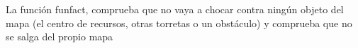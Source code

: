 La función funfact, comprueba que no vaya a chocar contra ningún objeto del mapa (el centro de recursos, otras torretas o un obstáculo) y comprueba que no se salga del propio mapa
